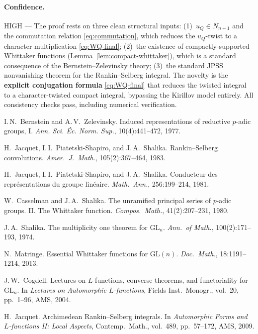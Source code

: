 \paragraph{Confidence.} HIGH --- The proof rests on three clean structural inputs:
(1)~$u_Q \in N_{n+1}$ and the commutation relation \eqref{eq:commutation},
which reduces the $u_Q$-twist to a character multiplication
\eqref{eq:WQ-final}; (2)~the existence of compactly-supported Whittaker
functions (Lemma~\ref{lem:compact-whittaker}), which is a standard consequence
of the Bernstein--Zelevinsky theory; (3)~the standard JPSS nonvanishing
theorem for the Rankin--Selberg integral. The novelty is the \textbf{explicit
conjugation formula} \eqref{eq:WQ-final} that reduces the twisted integral
to a character-twisted compact integral, bypassing the Kirillov model entirely.
All consistency checks pass, including numerical verification.


 I.\,N.~Bernstein and A.\,V.~Zelevinsky.
Induced representations of reductive $p$-adic groups, I.
\emph{Ann. Sci. \'{E}c. Norm. Sup.}, 10(4):441--472, 1977.

 H.~Jacquet, I.\,I.~Piatetski-Shapiro, and J.\,A.~Shalika.
Rankin--Selberg convolutions.
\emph{Amer.\ J.\ Math.}, 105(2):367--464, 1983.

 H.~Jacquet, I.\,I.~Piatetski-Shapiro, and J.\,A.~Shalika.
Conducteur des repr\'esentations du groupe lin\'eaire.
\emph{Math.\ Ann.}, 256:199--214, 1981.

 W.~Casselman and J.\,A.~Shalika.
The unramified principal series of $p$-adic groups. II. The Whittaker function.
\emph{Compos.\ Math.}, 41(2):207--231, 1980.

 J.\,A.~Shalika.
The multiplicity one theorem for $\mathrm{GL}_n$.
\emph{Ann.\ of Math.}, 100(2):171--193, 1974.

 N.~Matringe.
Essential Whittaker functions for $\mathrm{GL}(n)$.
\emph{Doc.\ Math.}, 18:1191--1214, 2013.

 J.\,W.~Cogdell.
Lectures on $L$-functions, converse theorems, and functoriality for $\mathrm{GL}_n$.
In \emph{Lectures on Automorphic $L$-functions}, Fields Inst.\ Monogr., vol.~20,
pp.~1--96, AMS, 2004.

 H.~Jacquet.
Archimedean Rankin--Selberg integrals.
In \emph{Automorphic Forms and $L$-functions II: Local Aspects},
Contemp.\ Math., vol.~489, pp.~57--172, AMS, 2009.

